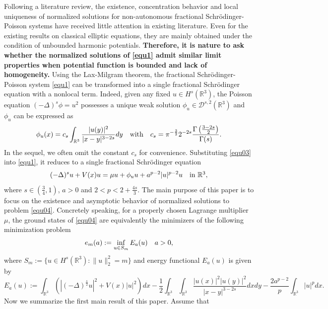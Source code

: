 \documentclass[reqno, 11pt]{amsart} %
\numberwithin{equation}{section}
\begin{document}
	
	Following a literature review, the existence, concentration behavior and local uniqueness of normalized solutions for non-autonomous fractional Schr\"{o}dinger-Poisson systems have received little attention in existing literature. Even for the existing results on classical elliptic equations, they are mainly obtained under the condition of unbounded harmonic potentials.
	{\bf Therefore, it is nature to ask whether the normalized solutions of \eqref{equ1} admit similar limit properties when potential function is bounded and lack of homogeneity.} Using the Lax-Milgram theorem, the fractional Schr\"{o}dinger-Poisson system \eqref{equ1} can be transformed into a single fractional Schr\"{o}dinger equation with a nonlocal term. Indeed, given any fixed $u\in H^{s}(\mathbb{R}^{3})$, the Poisson equation $(-\Delta)^{s}\phi=u^{2}$ possesses a unique weak solution $\phi_{u}\in \mathcal{D}^{s, 2}(\mathbb{R}^{3})$ and $\phi_{u}$ can be expressed as
	\begin{equation}\label{equ03}
		\phi_{u}(x)=c_{s}\int_{\mathbb{R}^{3}}\frac{|u(y)|^{2}}{|x-y|^{3-2s}}dy\quad \hbox{with}\quad c_{s}=\pi^{-\frac{3}{2}}2^{-2s}\frac{\Gamma\left( \frac{3-2s}{2}\right) }{\Gamma(s)}.
	\end{equation}
	In the sequel, we often omit the constant $c_{s}$ for convenience. Substituting \eqref{equ03} into \eqref{equ1}, it reduces to a single fractional Schr\"{o}dinger equation
	\begin{equation}\label{equ04}
		(-\Delta)^{s}u+V(x)u=\mu u+\phi_{u} u+a^{p-2}|u|^{p-2}u\quad \hbox{in $\mathbb{R}^{3}$},
	\end{equation}
	where $s\in (\frac{3}{4}, 1)$, $a>0$ and $2<p<2+\frac{4s}{3}$. The main purpose of this paper is to focus on the existence and asymptotic behavior of normalized solutions to problem \eqref{equ04}. Concretely speaking, for a properly chosen Lagrange multiplier $\mu$, the ground states of \eqref{equ04} are equivalently the minimizers of the following minimization problem
	\begin{equation}\label{equ2}
		e_{m}(a):=\inf_{u\in S_{m}}E_{a}(u) \quad \hbox{$a>0$},
	\end{equation}
	where $S_{m}:=\{u\in H^{s}(\mathbb{R}^{3}): \|u\|_{2}^{2}=m\}$ and  energy functional $E_{a}(u)$ is given by
	\begin{equation}\label{equ3}
		E_{a}(u):=\int_{\mathbb{R}^{3}}(|(-\Delta)^{\frac{s}{2}} u|^{2}+V(x)|u|^{2})dx-\frac{1}{2}\int_{\mathbb{R}^{3}}\int_{\mathbb{R}^{3}}\frac{|u(x)|^{2}|u(y)|^{2}}{|x-y|^{3-2s}}dxdy-\frac{2a^{p-2}}{p}\int_{\mathbb{R}^{3}}|u|^{p}dx.
	\end{equation}	
Now we summarize the first main result of this paper. Assume that\\
\end{document}

